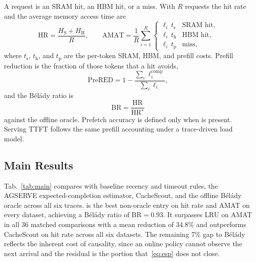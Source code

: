 A request is an SRAM hit, an HBM hit, or a miss. With $R$ requests the
hit rate and the average memory access time are
\begin{equation}
  \mathrm{HR}=\frac{H_{\mathrm{S}}+H_{\mathrm{H}}}{R},
  \qquad
  \mathrm{AMAT}=\frac{1}{R}\sum_{i=1}^{R}
    \begin{cases}
      \ell_i\,t_{\mathrm{s}} & \text{SRAM hit},\\
      \ell_i\,t_{\mathrm{h}} & \text{HBM hit},\\
      \ell_i\,t_{\mathrm{p}} & \text{miss},
    \end{cases}
  \label{eq:hr-amat}
\end{equation}
where $t_{\mathrm{s}}$, $t_{\mathrm{h}}$, and $t_{\mathrm{p}}$ are the
per-token SRAM, HBM, and prefill costs. Prefill reduction is the
fraction of those tokens that a hit avoids,
\begin{equation}
  \mathrm{PreRED}=1-\frac{\sum_i \ell_i^{\mathrm{comp}}}{\sum_i \ell_i},
  \label{eq:prered}
\end{equation}
and the B\'el\'ady ratio is
\begin{equation}
  \mathrm{BR}
  =\frac{\mathrm{HR}}{\mathrm{HR}^{\star}}
  \label{eq:br}
\end{equation}
against the offline oracle. Prefetch accuracy is defined only when \tide
is present. Serving TTFT follows the same prefill accounting under a
trace-driven load model.

\subsection{Main Results}
\label{sec:sw-main}

Tab.~\ref{tab:main} compares \unison with baseline recency and timeout
rules, the AGSERVE expected-completion estimator, CacheScout, and the
offline B\'el\'ady oracle across all six traces. \unison is the best
non-oracle entry on hit rate and AMAT on every dataset, achieving a
B\'el\'ady ratio of $\mathrm{BR}{=}0.93$. It surpasses LRU on AMAT in
all 36 matched comparisons with a mean reduction of 34.8\% and
outperforms CacheScout on hit rate across all six datasets. The
remaining 7\% gap to B\'el\'ady reflects the inherent cost of
causality, since an online policy cannot observe the next arrival and
the residual is the portion that~\eqref{eq:esp} does not close.

